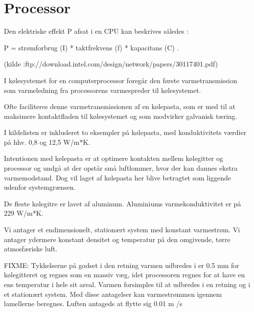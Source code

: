 \section{Processor}

Den elektriske effekt P afsat i en CPU kan beskrives således :

 P = strømforbrug (I) * taktfrekvens (f) * kapacitans (C) .

 (kilde :ftp://download.intel.com/design/network/papers/30117401.pdf)

I kølesystemet for en computerprocessor foregår den første varmetransmission som varmeledning fra processorens varmespreder til kølesystemet.

Ofte faciliteres denne varmetransmissionen af en kølepasta, som er med til at maksimere kontaktfladen til kølesystemet og som modvirker galvanisk tæring.

I kildelisten er inkluderet to eksempler på kølepasta, med konduktivitets værdier på hhv. 0,8 og 12,5 W/m*K.

Intentionen med kølepasta er at optimere kontakten mellem kølegitter og processor og undgå at der opstår små luftlommer, hvor der kan dannes ekstra varmemodstand. Dog vil laget af kølepasta her blive betragtet som liggende udenfor systemgrænsen.

De fleste kølegitre er lavet af aluminum. Aluminiums varmekonduktivitet er på 229 W/m*K.

Vi antager et endimensionelt, stationært system med konstant varmestrøm. Vi antager ydermere konstant densitet og temperatur på den omgivende, tørre atmosfæriske luft.

FIXME:
Tykkelserne på godset i den retning varmen udbredes i er 0.5 mm for kølegitteret og regnes som en massiv væg, idet processoren regnes for at have en ens temperatur i hele sit areal.  Varmen forsimples til at udbredes i en retning og i et stationært system.  Med disse antagelser kan varmestrømmen igennem lamellerne beregnes.
Luften antageds at flytte sig 0.01 m /s